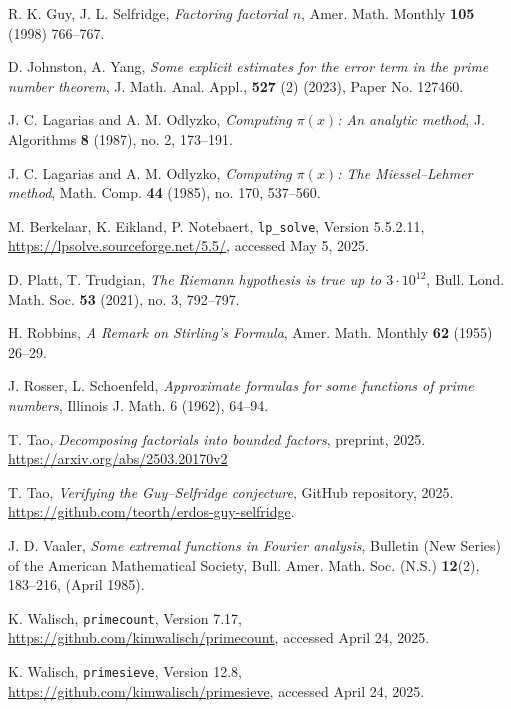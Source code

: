 \documentclass[12pt,a4paper,reqno]{amsart}
\numberwithin{equation}{section}
\theoremstyle{plain}
\theoremstyle{definition}
\begin{document}
\begin{thebibliography}{10}
R. K. Guy, J. L. Selfridge, \emph{Factoring factorial $n$}, Amer. Math. Monthly \textbf{105} (1998) 766--767.

D. Johnston, A. Yang, \emph{Some explicit estimates for the error term in the prime number theorem}, J. Math. Anal. Appl., \textbf{527} (2) (2023), Paper No. 127460.

J. C. Lagarias and A. M. Odlyzko, \emph{Computing $\pi(x)$: An analytic method}, J. Algorithms \textbf{8} (1987), no. 2, 173--191.

J. C. Lagarias and A. M. Odlyzko, \emph{Computing $\pi(x)$: The Miessel--Lehmer method}, Math. Comp. \textbf{44} (1985), no. 170, 537--560.

M. Berkelaar, K. Eikland, P. Notebaert, \texttt{lp\_solve}, Version 5.5.2.11, \url{https://lpsolve.sourceforge.net/5.5/}, accessed May 5, 2025.

D. Platt, T. Trudgian, \emph{The Riemann hypothesis is true up to $3\cdot10^{12}$}, Bull. Lond. Math. Soc. \textbf{53} (2021), no. 3, 792--797.

H. Robbins, \emph{A Remark on Stirling's Formula}, Amer. Math. Monthly \textbf{62} (1955) 26--29.


J. Rosser, L. Schoenfeld, \emph{Approximate formulas for some functions of prime numbers}, Illinois J. Math. 6 (1962), 64--94.

T. Tao, \emph{Decomposing factorials into bounded factors}, preprint, 2025. \url{https://arxiv.org/abs/2503.20170v2}

T. Tao, \emph{Verifying the Guy--Selfridge conjecture}, GitHub repository, 2025.  \url{https://github.com/teorth/erdos-guy-selfridge}.

J. D. Vaaler, \emph{Some extremal functions in Fourier analysis}, Bulletin (New Series) of the American Mathematical Society, Bull. Amer. Math. Soc. (N.S.) \textbf{12}(2), 183--216, (April 1985).

K. Walisch, \texttt{primecount}, Version 7.17, \url{https://github.com/kimwalisch/primecount}, accessed April 24, 2025. 

K. Walisch, \texttt{primesieve}, Version 12.8, \url{https://github.com/kimwalisch/primesieve}, accessed April 24, 2025. 

\end{thebibliography}
\end{document}
